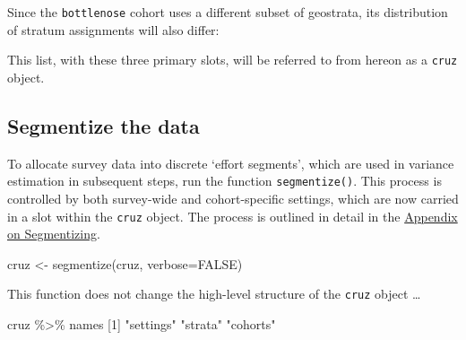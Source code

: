 \documentclass[
]{book}
\newenvironment{Shaded}{\begin{snugshade}}{\end{snugshade}}
\newcommand{\AttributeTok}[1]{\textcolor[rgb]{0.77,0.63,0.00}{#1}}
\newcommand{\ConstantTok}[1]{\textcolor[rgb]{0.00,0.00,0.00}{#1}}
\newcommand{\DecValTok}[1]{\textcolor[rgb]{0.00,0.00,0.81}{#1}}
\newcommand{\FunctionTok}[1]{\textcolor[rgb]{0.00,0.00,0.00}{#1}}
\newcommand{\NormalTok}[1]{#1}
\newcommand{\OtherTok}[1]{\textcolor[rgb]{0.56,0.35,0.01}{#1}}
\newcommand{\SpecialCharTok}[1]{\textcolor[rgb]{0.00,0.00,0.00}{#1}}
\newcommand{\StringTok}[1]{\textcolor[rgb]{0.31,0.60,0.02}{#1}}
\begin{document}
Since the \texttt{bottlenose} cohort uses a different subset of geostrata, its distribution of stratum assignments will also differ:

\begin{Shaded}
\end{Shaded}

This list, with these three primary slots, will be referred to from hereon as a \texttt{cruz} object.

\hypertarget{segmentize-the-data}{%
\subsection*{Segmentize the data}\label{segmentize-the-data}}

To allocate survey data into discrete `effort segments', which are used in variance estimation in subsequent steps, run the function \texttt{segmentize()}. This process is controlled by both survey-wide and cohort-specific \protect\hypertarget{settings}{}{settings}, which are now carried in a slot within the \texttt{cruz} object. The process is outlined in detail in the \protect\hyperlink{segmentizing}{Appendix on Segmentizing}.

\begin{Shaded}
\begin{Highlighting}[]
\NormalTok{cruz }\OtherTok{\textless{}{-}} \FunctionTok{segmentize}\NormalTok{(cruz, }\AttributeTok{verbose=}\ConstantTok{FALSE}\NormalTok{)}
\end{Highlighting}
\end{Shaded}

This function does not change the high-level structure of the \texttt{cruz} object \ldots{}

\begin{Shaded}
\begin{Highlighting}[]
\NormalTok{cruz }\SpecialCharTok{\%\textgreater{}\%}\NormalTok{ names}
\NormalTok{[}\DecValTok{1}\NormalTok{] }\StringTok{"settings"} \StringTok{"strata"}   \StringTok{"cohorts"} 
\end{Highlighting}
\end{Shaded}
\end{document}
